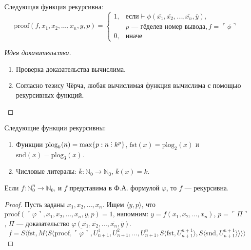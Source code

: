 \begin{theorem}
    Следующая функция рекурсивна:
$$\text{proof}(f,x_1,x_2,\dots,x_n,y,p) = \left\{\begin{array}{ll}
1, & \mbox{если} \vdash\phi(\overline{x_1},\overline{x_2},\dots,\overline{x_n},\overline{y}),\\
   & p \mbox{ --- гёделев номер вывода}, f = \ulcorner\phi\urcorner \\
0, & \mbox{иначе}
\end{array}\right.$$\vspace{-0.1cm}
\end{theorem}
\begin{proof}[Идея доказательства]
\begin{enumerate}
\item Проверка доказательства вычислима.
\item Согласно тезису Чёрча, любая вычислимая функция
вычислима с помощью рекурсивных функций.
\end{enumerate}
\end{proof}

\begin{lemma}
    Следующие функции рекурсивны:
\begin{enumerate}
\item Функции $\text{plog}_k(n) = \max\{p: n \divisible k^p\}$, $\text{fst}(x) = \text{plog}_2(x)$ и $\text{snd}(x) = \text{plog}_3(x)$.
\item Числовые литералы: $\overline{k}: \mathbb{N}_0 \rightarrow \mathbb{N}_0$, $\overline{k}(x) = k$.
\end{enumerate}
\end{lemma}

\begin{theorem}
    Если $f: \mathbb{N}^n_0\rightarrow\mathbb{N}_0$, и $f$ представима в Ф.А. формулой $\varphi$, то $f$ --- рекурсивна.
\end{theorem}
\begin{proof}
Пусть заданы $x_1,x_2,\dots,x_n$. Ищем $\langle y, p\rangle$,
что $\text{proof}(\ulcorner\varphi\urcorner,x_1,x_2,\dots,x_n,y,p)=1$,
напомним: $y = f(x_1,x_2,\dots,x_n)$, $p = \ulcorner\Pi\urcorner$,
$\Pi$ --- доказательство $\varphi(\overline{x_1},\overline{x_2},\dots,\overline{x_n},\overline{y})$.
$$f = S \langle \text{fst}, M\langle S \langle \text{proof}, \overline{\ulcorner\varphi\urcorner}, U^1_{n+1}, U^2_{n+1}, \dots, U^n_{n+1},
  S \langle \text{fst},U^{n+1}_{n+1}\rangle, S\langle \text{snd}, U^{n+1}_{n+1}\rangle \rangle \rangle \rangle$$
\end{proof}


